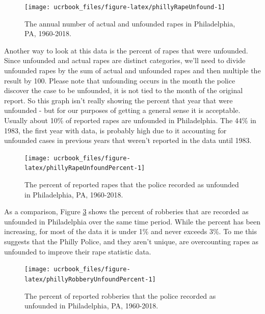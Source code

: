 \documentclass[
  12pt,
  openany]{book}
\begin{document}
\begin{figure}

{\centering \texttt{[image: ucrbook\_files/figure-latex/phillyRapeUnfound-1]} 

}

\caption{The annual number of actual and unfounded rapes in Philadelphia, PA, 1960-2018.}\label{fig:phillyRapeUnfound}
\end{figure}

Another way to look at this data is the percent of rapes that were unfounded. Since unfounded and actual rapes are distinct categories, we'll need to divide unfounded rapes by the sum of actual and unfounded rapes and then multiple the result by 100. Please note that unfounding occurs in the month the police discover the case to be unfounded, it is not tied to the month of the original report. So this graph isn't really showing the percent that year that were unfounded - but for our purposes of getting a general sense it is acceptable. Usually about 10\% of reported rapes are unfounded in Philadelphia. The 44\% in 1983, the first year with data, is probably high due to it accounting for unfounded cases in previous years that weren't reported in the data until 1983.

\begin{figure}

{\centering \texttt{[image: ucrbook\_files/figure-latex/phillyRapeUnfoundPercent-1]} 

}

\caption{The percent of reported rapes that the police recorded as unfounded in Philadelphia, PA, 1960-2018.}\label{fig:phillyRapeUnfoundPercent}
\end{figure}

As a comparison, Figure \ref{fig:phillyRobberyUnfoundPercent} shows the percent of robberies that are recorded as unfounded in Philadelphia over the same time period. While the percent has been increasing, for most of the data it is under 1\% and never exceeds 3\%. To me this suggests that the Philly Police, and they aren't unique, are overcounting rapes as unfounded to improve their rape statistic data.

\begin{figure}

{\centering \texttt{[image: ucrbook\_files/figure-latex/phillyRobberyUnfoundPercent-1]} 

}

\caption{The percent of reported robberies that the police recorded as unfounded in Philadelphia, PA, 1960-2018.}\label{fig:phillyRobberyUnfoundPercent}
\end{figure}
\end{document}
